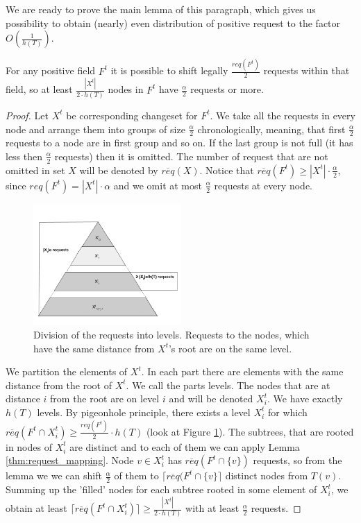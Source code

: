 We are ready to prove the main lemma of this paragraph, which gives us 
possibility to obtain (nearly) even distribution of positive request to the 
factor $O(\frac{1}{h(T)})$.
\begin{lemma}
For any positive field $F^t$ it is possible to shift 
legally $\frac{req(F^t)}{2}$ requests within that field, so at least 
$\frac{|X^t|}{2 \cdot h(T)}$ nodes in $F^t$ have 
$\frac{\alpha}{2}$ requests or more.
\label{thm:legal_shifting_down}
\end{lemma}
\begin{proof}
Let $X^t$ be corresponding changeset for $F^t$. We take all the requests in 
every node and arrange them into groups of size $\frac{\alpha}{2}$ 
chronologically, meaning, that first $\frac{\alpha}{2}$ requests to a node are 
in first group and so on. If the last group is not full (it has less then  
$\frac{\alpha}{2}$ requests) then it is omitted. The number of request that are 
not omitted in set $X$ will be denoted by $\overline{req}(X)$. Notice that  
$\overline{req}(F^t) \geq |X^t| \cdot \frac{\alpha}{2}$, since $req(F^t) = 
|X^t| \cdot \alpha$ and we omit at most $\frac{\alpha}{2}$ requests at every 
node.
 \begin{figure}
 \begin{center}
  \includegraphics[width=0.5\textwidth]{layers.png}
\end{center}
\caption{Division of the requests into levels. Requests to the nodes, which 
have the same distance from $X^t$'s root are on the same level.}
\label{fig:layers}
\end{figure}

We partition the elements of $X^t$. In each part there are elements with the 
same distance from the root of $X^t$. We call the parts levels. The nodes that 
are at distance $i$ from the root are on level $i$ and will be denoted $X^t_i$. 
We have exactly $h(T)$ levels. By pigeonhole principle, there exists a level 
$X^t_i$ for which $\overline{req}(F^t \cap X^t_i) \geq \frac{req(F^t)}{2} \cdot 
h(T)$ (look at Figure \ref{fig:layers}). The subtrees, that are rooted in nodes 
of $X^t_i$ are distinct and to each of them we can apply Lemma 
\ref{thm:request_mapping}. Node $v \in X^t_i$ has $\overline{req}(F^t \cap 
\{v\})$ requests, so from the lemma we we can shift $\frac{\alpha}{2}$ of 
them to $\lceil \overline{req}(F^t \cap \{v\} \rceil$ distinct nodes from 
$T(v)$. Summing up the 'filled' nodes for each subtree rooted in some element 
of $X^t_i$, we obtain at least 
$\lceil \overline{req}(F^t \cap X^t_i) \rceil \geq \frac{|X^t|}{2 \cdot h(T)}$ 
with at least $\frac{\alpha}{2}$ requests.
\end{proof}
